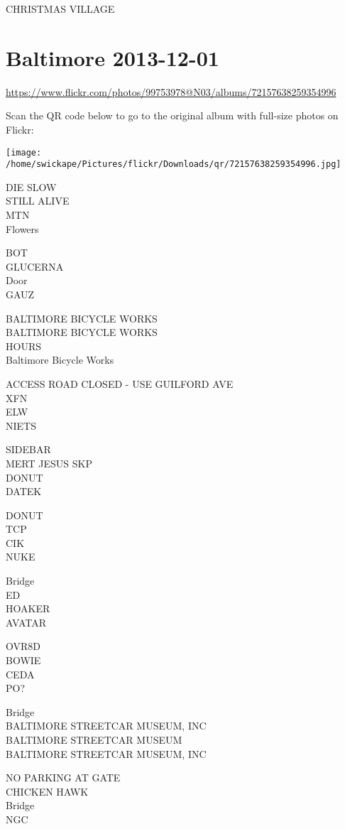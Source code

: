 \documentclass[10pt,letterpaper]{article}
\begin{document}
CHRISTMAS VILLAGE


\section*{Baltimore 2013-12-01}

\url{https://www.flickr.com/photos/99753978@N03/albums/72157638259354996}

Scan the QR code below to go to the original album with full-size photos on Flickr:

\texttt{[image: /home/swickape/Pictures/flickr/Downloads/qr/72157638259354996.jpg]}


DIE SLOW\\
STILL ALIVE\\
MTN\\
Flowers

BOT\\
GLUCERNA\\
Door\\
GAUZ

BALTIMORE BICYCLE WORKS\\
BALTIMORE BICYCLE WORKS\\
HOURS\\
Baltimore Bicycle Works

ACCESS ROAD CLOSED {-} USE GUILFORD AVE\\
XFN\\
ELW\\
NIETS

SIDEBAR\\
MERT JESUS SKP\\
DONUT\\
DATEK

DONUT\\
TCP\\
CIK\\
NUKE

Bridge\\
ED\\
HOAKER\\
AVATAR

OVR8D\\
BOWIE\\
CEDA\\
PO?

Bridge\\
BALTIMORE STREETCAR MUSEUM, INC\\
BALTIMORE STREETCAR MUSEUM\\
BALTIMORE STREETCAR MUSEUM, INC

NO PARKING AT GATE\\
CHICKEN HAWK\\
Bridge\\
NGC
\end{document}
